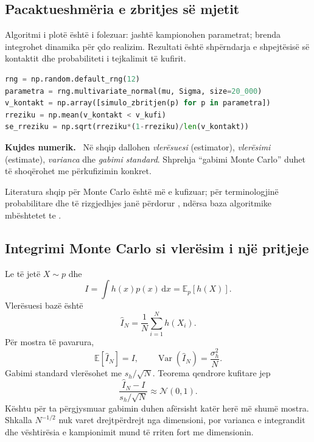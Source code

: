 \documentclass[11pt,oneside,openany]{book}
\newcommand{\E}{\mathbb{E}}
\newcommand{\Var}{\operatorname{Var}}
\newcommand{\dd}{\,\mathrm{d}}
\newenvironment{kujdes}{\par\medskip\noindent\textbf{Kujdes numerik.}\ }{\par\medskip}
\begin{document}
\subsection{Pacaktueshmëria e zbritjes së mjetit}
Algoritmi i plotë është i folezuar: jashtë kampionohen parametrat; brenda integrohet dinamika për çdo realizim. Rezultati është shpërndarja e shpejtësisë së kontaktit dhe probabiliteti i tejkalimit të kufirit.
\begin{lstlisting}[language=Python]
rng = np.random.default_rng(12)
parametra = rng.multivariate_normal(mu, Sigma, size=20_000)
v_kontakt = np.array([simulo_zbritjen(p) for p in parametra])
rreziku = np.mean(v_kontakt < v_kufi)
se_rreziku = np.sqrt(rreziku*(1-rreziku)/len(v_kontakt))
\end{lstlisting}

\begin{kujdes}
Në shqip dallohen \emph{vlerësuesi} (estimator), \emph{vlerësimi} (estimate), \emph{varianca} dhe \emph{gabimi standard}. Shprehja ``gabimi Monte Carlo'' duhet të shoqërohet me përkufizimin konkret.
\end{kujdes}

Literatura shqip për Monte Carlo është më e kufizuar; për terminologjinë probabilitare dhe të rizgjedhjes janë përdorur \cite{butka,tasho,hyka}, ndërsa baza algoritmike mbështetet te \cite{newman,robert,press}.



\subsection{Integrimi Monte Carlo si vlerësim i një pritjeje}
Le të jetë $X\sim p$ dhe
\begin{equation}
 I=\int h(x)p(x)\dd x=\E_p[h(X)].
\end{equation}
Vlerësuesi bazë është
\begin{equation}
 \widehat I_N=\frac1N\sum_{i=1}^{N}h(X_i).
\end{equation}
Për mostra të pavarura,
\begin{equation}
 \E[\widehat I_N]=I,
 \qquad
 \Var(\widehat I_N)=\frac{\sigma_h^2}{N}.
\end{equation}
Gabimi standard vlerësohet me $s_h/\sqrt N$. Teorema qendrore kufitare jep
\begin{equation}
 \frac{\widehat I_N-I}{s_h/\sqrt N}\approx\mathcal N(0,1).
\end{equation}
Kështu për ta përgjysmuar gabimin duhen afërsisht katër herë më shumë mostra. Shkalla $N^{-1/2}$ nuk varet drejtpërdrejt nga dimensioni, por varianca e integrandit dhe vështirësia e kampionimit mund të rriten fort me dimensionin.
\end{document}
